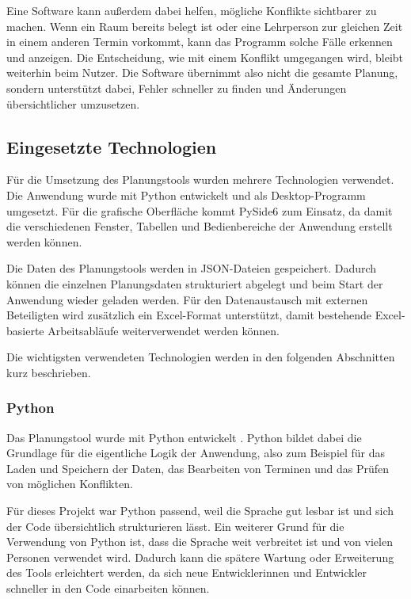 \documentclass[12pt,a4paper]{article}
\begin{document}
Eine Software kann außerdem dabei helfen, mögliche Konflikte sichtbarer zu machen. Wenn ein Raum bereits belegt ist oder eine Lehrperson zur gleichen Zeit in einem anderen Termin vorkommt, kann das Programm solche Fälle erkennen und anzeigen. Die Entscheidung, wie mit einem Konflikt umgegangen wird, bleibt weiterhin beim Nutzer. Die Software übernimmt also nicht die gesamte Planung, sondern unterstützt dabei, Fehler schneller zu finden und Änderungen übersichtlicher umzusetzen.


\subsection{Eingesetzte Technologien}

Für die Umsetzung des Planungstools wurden mehrere Technologien verwendet. Die Anwendung wurde mit Python entwickelt und als Desktop-Programm umgesetzt. Für die grafische Oberfläche kommt PySide6 zum Einsatz, da damit die verschiedenen Fenster, Tabellen und Bedienbereiche der Anwendung erstellt werden können.

Die Daten des Planungstools werden in JSON-Dateien gespeichert. Dadurch können die einzelnen Planungsdaten strukturiert abgelegt und beim Start der Anwendung wieder geladen werden. Für den Datenaustausch mit externen Beteiligten wird zusätzlich ein Excel-Format unterstützt, damit bestehende Excel-basierte Arbeitsabläufe weiterverwendet werden können.

Die wichtigsten verwendeten Technologien werden in den folgenden Abschnitten kurz beschrieben.

\subsubsection{Python}

Das Planungstool wurde mit Python entwickelt \cite{pythonDocs}. Python bildet dabei die Grundlage für die eigentliche Logik der Anwendung, also zum Beispiel für das Laden und Speichern der Daten, das Bearbeiten von Terminen und das Prüfen von möglichen Konflikten.

Für dieses Projekt war Python passend, weil die Sprache gut lesbar ist und sich der Code übersichtlich strukturieren lässt. Ein weiterer Grund für die Verwendung von Python ist, dass die Sprache weit verbreitet ist und von vielen Personen verwendet wird. Dadurch kann die spätere Wartung oder Erweiterung des Tools erleichtert werden, da sich neue Entwicklerinnen und Entwickler schneller in den Code einarbeiten können.
\end{document}

